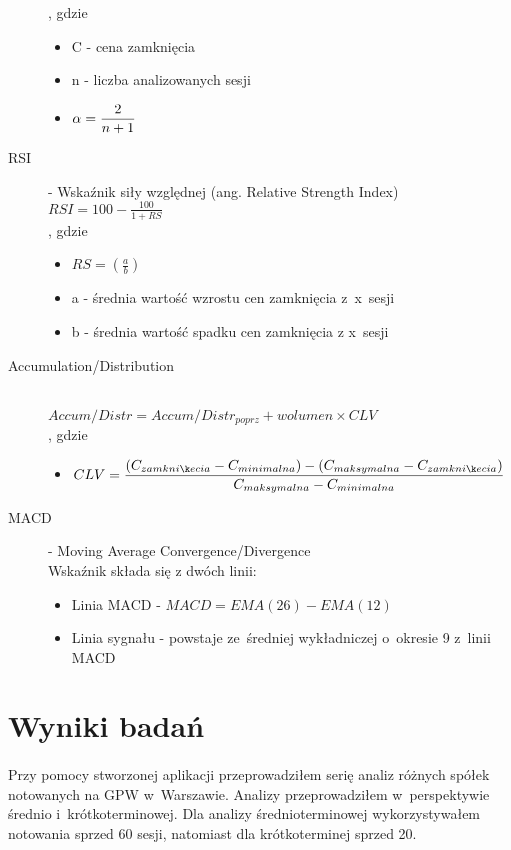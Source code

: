 \begin{description}
		, gdzie \hfill
			\begin{itemize}
				\item C - cena zamknięcia
				\item n - liczba analizowanych sesji
				\item $\displaystyle \alpha={2\over{n+1}}$
			\end{itemize}
	\item[RSI] - Wskaźnik siły względnej (ang. Relative Strength Index) \hfill \\
		$\displaystyle RSI = 100 - \frac{100}{1+RS}$ \\
		, gdzie \hfill
			\begin{itemize}
				\item $\displaystyle RS = \left( \frac {a}{b} \right)$
				\item a - średnia wartość wzrostu cen zamknięcia z~x~sesji
				\item b - średnia wartość spadku cen zamknięcia z x~sesji
			\end{itemize}
	\item[Accumulation/Distribution] \hfill \\
		$\displaystyle Accum/Distr = Accum/Distr_{poprz} + wolumen \times CLV$ \\
		, gdzie \hfill
			\begin{itemize}
				\item $\displaystyle CLV = { (C_{zamknięcia} - C_{minimalna}) - (C_{maksymalna} - C_{zamknięcia}) \over C_{maksymalna} - C_{minimalna}}$
			\end{itemize}
	\item[MACD] - Moving Average Convergence/Divergence \hfill \\
		Wskaźnik składa się z dwóch linii:
		\begin{itemize}
			\item Linia MACD - $\displaystyle MACD = EMA(26) - EMA(12)$
			\item Linia sygnału - powstaje ze~średniej wykładniczej o~okresie 9 z~linii MACD
		\end{itemize}
\end{description}

\section{Wyniki badań}

\paragraph{}
Przy pomocy stworzonej aplikacji przeprowadziłem serię analiz różnych spółek notowanych na GPW w~Warszawie. Analizy przeprowadziłem w~perspektywie średnio i~krótkoterminowej. Dla analizy średnioterminowej wykorzystywałem notowania sprzed 60 sesji, natomiast dla krótkoterminej sprzed 20.